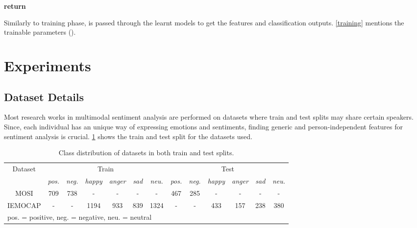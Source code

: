 \documentclass[review]{elsarticle}
\newcommand\?[1]{\hl{#1}}
\begin{document}
\begin{algorithm}[!ht]
\begin{algorithmic}[1]
        
        \vspace{2mm}
         
        \State 
        \EndFor
        \State 
        \State \textbf{return} 
        \EndProcedure
        
        \vspace{2mm}
        \State \footnotesize{Similarly to training phase,  is passed through the learnt models
        to get the features and classification outputs. \cref{training}
        mentions the trainable parameters ().}
        \EndProcedure
    \end{algorithmic}
\end{algorithm}

\section{Experiments}
\label{sec:experiments}

\subsection{Dataset Details}
\label{datasets}
Most research works in multimodal sentiment analysis are performed on datasets
where train and test splits may share certain speakers. Since, each individual
has an unique way of expressing emotions and sentiments, finding generic and
person-independent features for sentiment analysis is
crucial. \cref{tab:dataset} shows the train and test split for the datasets
used.

\begin{table}[h]
	\small
	      \addtolength\tabcolsep{-5pt} \begin{center}
		\begin{tabular}{|*{14}{c|}}
			\hline
			\multicolumn{2}{|c|}{\multirow{2}{*}{Dataset}} & \multicolumn{6}{c|}{Train} & \multicolumn{6}{c|}{Test}\\ \cline{3-14}
			\multicolumn{2}{|c|}{}& \emph{pos.}&\emph{neg.}&\emph{happy}&\emph{anger}&\emph{sad}&\emph{neu.}&\emph{pos.}&\emph{neg.}&\emph{happy}&\emph{anger}&\emph{sad}&\emph{neu.}\\ \hline
			\multicolumn{2}{|c|}{MOSI}&709&738&-&-&-&-&467&285&-&-&-&-\\ \hline
			\multicolumn{2}{|c|}{IEMOCAP}&-&-&1194&933&839&1324&-&-&433&157&238&380\\ \hline
			\multicolumn{14}{l}{\scriptsize{pos. = positive, neg. = negative, neu. = neutral}}
		\end{tabular}
	\end{center}
	\vspace{-4.5mm}
	\caption {Class distribution of datasets in both train and test splits. }
	\label{tab:dataset}
\end{table}
\end{document}
